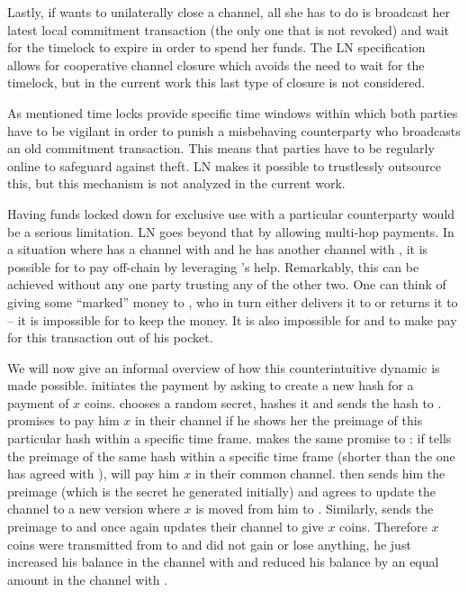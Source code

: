     Lastly, if \alice{} wants to unilaterally close a channel, all she has to do
    is broadcast her latest local commitment transaction (the only one that is
    not revoked) and wait for the timelock to expire in order to spend her
    funds. The LN specification allows for cooperative channel closure which
    avoids the need to wait for the timelock, but in the current work this last
    type of closure is not considered.

    As mentioned time locks provide specific time windows within which both
    parties have to be vigilant in order to punish a misbehaving  counterparty
    who  broadcasts an old commitment transaction. This means that parties have
    to be regularly online to safeguard against theft. LN makes it possible to
    trustlessly outsource this, but this mechanism is not analyzed in the
    current work.

    Having funds locked down for exclusive use with a particular counterparty
    would be a serious limitation. LN goes beyond that by allowing multi-hop
    payments. In a situation where \alice{} has a channel with \bob{} and he has
    another channel with \charlie{}, it is possible for \alice{} to pay
    \charlie{} off-chain by leveraging \bob's help. Remarkably, this can be
    achieved without any one party trusting any of the other two. One can think
    of \alice{} giving some ``marked'' money to \bob{}, who in turn either
    delivers it to \charlie{} or returns it to \alice{} -- it is impossible for
    \bob{} to keep the money. It is also impossible for \alice{} and \charlie{}
    to make \bob{} pay for this transaction out of his pocket.

    We will now give an informal overview of how this counterintuitive dynamic
    is made possible. \alice{} initiates the payment by asking \charlie{} to
    create a new hash for a payment of $x$ coins. \charlie{} chooses a random
    secret, hashes it and sends the hash to \alice. \alice{} promises \bob{} to
    pay him $x$ in their channel if he shows her the preimage of this particular
    hash within a specific time frame. \bob{} makes the same promise to
    \charlie{}: if \charlie{} tells \bob{} the preimage of the same hash within
    a specific time frame (shorter than the one \bob{} has agreed with
    \alice{}), \bob{} will pay him $x$ in their common channel. \charlie{} then
    sends him the preimage (which is the secret he generated initially) and
    \bob{} agrees to update the channel to a new version where $x$ is moved from
    him to \charlie. Similarly, \bob{} sends the preimage to \alice{} and once
    again \alice{} updates their channel to give \bob{} $x$ coins. Therefore $x$
    coins were transmitted from \alice{} to \charlie{} and \bob{} did not gain
    or lose anything, he just increased his balance in the channel with \alice{}
    and reduced his balance by an equal amount in the channel with \charlie.

